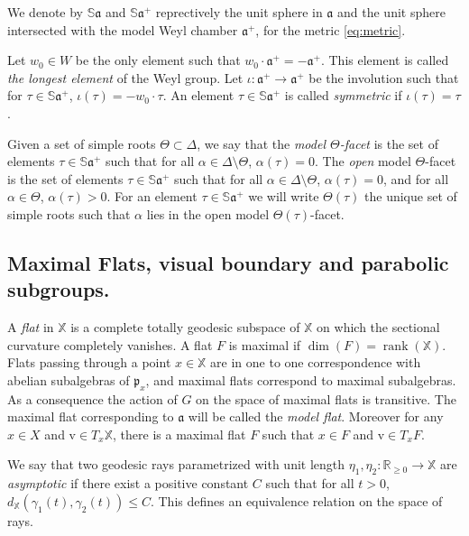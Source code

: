 \documentclass[reqno,10pt]{amsart}
\theoremstyle{plain}
\theoremstyle{definition}
\theoremstyle{remark}
\newcommand{\type}{\tau}
\newcommand{\R}{\mathbb{R}}
\newcommand{\Sph}{\mathbb{S}}
\DeclareMathOperator{\rank}{rank}
\newcommand{\X}{\mathbb{X}}
\begin{document}
\medskip

We denote by $\Sph\mathfrak{a}$ and $\Sph\mathfrak{a}^+$ reprectively the unit sphere in $\mathfrak{a}$ and the unit sphere intersected with the model Weyl chamber $\mathfrak{a}^+$, for the metric \eqref{eq:metric}.

\medskip 

Let $w_0\in W$ be the only element such that $w_0\cdot \mathfrak{a}^+=-\mathfrak{a}^+$. This element is called \emph{the longest element} of the Weyl group. Let $\iota:\mathfrak{a}^+\to\mathfrak{a}^+$ be the involution such that for $\type\in \Sph\mathfrak{a}^+$, $\iota(\type)=-w_0\cdot \type$. An element $\type\in \Sph\mathfrak{a}^+$ is called \emph{symmetric} if $\iota(\type)=\type$.

\medskip

Given a set of simple roots $\Theta\subset \Delta$, we say that the \emph{model $\Theta$-facet} is the set of elements $\type\in \Sph\mathfrak{a}^+$ such that for all $\alpha\in \Delta\setminus \Theta$, $\alpha(\type)=0$. The \emph{open} model $\Theta$-facet is the set of elements $\type\in \Sph\mathfrak{a}^+$ such that for all $\alpha\in \Delta\setminus \Theta$, $\alpha(\type)=0$, and for all $\alpha \in \Theta$, $\alpha(\type)>0$. For an element $\type\in \Sph\mathfrak{a}^+$ we will write $\Theta(\type)$ the unique set of simple roots such that $\alpha$ lies in the open model $\Theta(\type)$-facet.


\subsection{Maximal Flats, visual boundary and parabolic subgroups.}

A \emph{flat} in $\X$ is a complete totally geodesic subspace of $\X$ on which the sectional curvature completely vanishes. A flat $F$ is maximal if $\dim(F)=\rank(\X)$. Flats passing through a point $x\in \X$ are in one to one correspondence with abelian subalgebras of $\mathfrak{p}_x$, and maximal flats correspond to maximal subalgebras. As a consequence the action of $G$ on the space of maximal flats is transitive. The maximal flat corresponding to $\mathfrak{a}$ will be called the \emph{model flat}.
Moreover for any $x\in X$ and $\mathrm{v}\in T_x\X$, there is a maximal flat $F$ such that $x\in F$ and $\mathrm{v}\in T_xF$.

\medskip

We say that two geodesic rays parametrized with unit length $\eta_1,\eta_2:\R_{\geq 0}\to \X$ are \emph{asymptotic} if there exist a positive constant $C$ such that for all $t>0$, $d_\X(\gamma_1(t),\gamma_2(t))\leq C$. This defines an equivalence relation on the space of rays.
\end{document}
